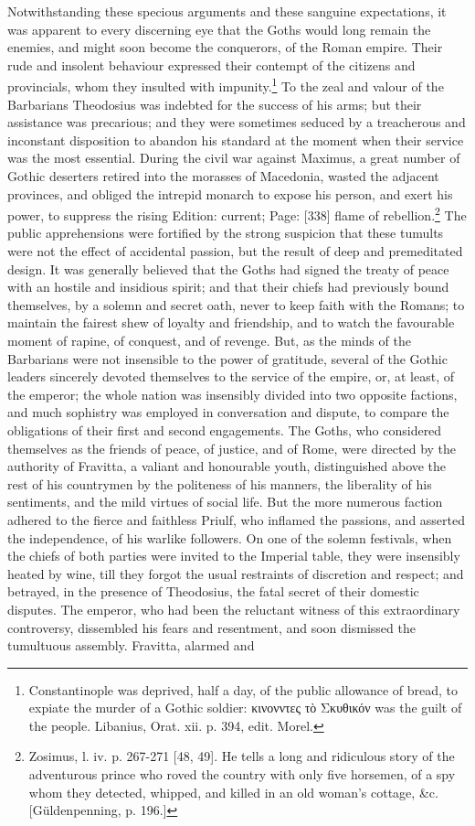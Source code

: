 Notwithstanding these specious arguments and these sanguine expectations, it was apparent to every discerning eye that the Goths would long remain the enemies, and might soon become the conquerors, of the Roman empire. Their rude and insolent behaviour expressed their contempt of the citizens and provincials, whom they insulted with impunity.\footnote{Constantinople was deprived, half a day, of the public allowance of bread, to expiate the murder of a Gothic soldier: \textgreek{κινονντες τ\texthebrew{ὸ} Σκυθικόν} was the guilt of the people. Libanius, Orat. xii. p. 394, edit. Morel.} To the zeal and valour of the Barbarians Theodosius was indebted for the success of his arms; but their assistance was precarious; and they were sometimes seduced by a treacherous and inconstant disposition to abandon his standard at the moment when their service was the most essential. During the civil war against Maximus, a great number of Gothic deserters retired into the morasses of Macedonia, wasted the adjacent provinces, and obliged the intrepid monarch to expose his person, and exert his power, to suppress the rising Edition: current; Page: [338] flame of rebellion.\footnote{Zosimus, l. iv. p. 267-271 [48, 49]. He tells a long and ridiculous story of the adventurous prince who roved the country with only five horsemen, of a spy whom they detected, whipped, and killed in an old woman\texthebrew{}’s cottage, \&c. [Güldenpenning, p. 196.]} The public apprehensions were fortified by the strong suspicion that these tumults were not the effect of accidental passion, but the result of deep and premeditated design. It was generally believed that the Goths had signed the treaty of peace with an hostile and insidious spirit; and that their chiefs had previously bound themselves, by a solemn and secret oath, never to keep faith with the Romans; to maintain the fairest shew of loyalty and friendship, and to watch the favourable moment of rapine, of conquest, and of revenge. But, as the minds of the Barbarians were not insensible to the power of gratitude, several of the Gothic leaders sincerely devoted themselves to the service of the empire, or, at least, of the emperor; the whole nation was insensibly divided into two opposite factions, and much sophistry was employed in conversation and dispute, to compare the obligations of their first and second engagements. The Goths, who considered themselves as the friends of peace, of justice, and of Rome, were directed by the authority of Fravitta, a valiant and honourable youth, distinguished above the rest of his countrymen by the politeness of his manners, the liberality of his sentiments, and the mild virtues of social life. But the more numerous faction adhered to the fierce and faithless Priulf, who inflamed the passions, and asserted the independence, of his warlike followers. On one of the solemn festivals, when the chiefs of both parties were invited to the Imperial table, they were insensibly heated by wine, till they forgot the usual restraints of discretion and respect; and betrayed, in the presence of Theodosius, the fatal secret of their domestic disputes. The emperor, who had been the reluctant witness of this extraordinary controversy, dissembled his fears and resentment, and soon dismissed the tumultuous assembly. Fravitta, alarmed and 